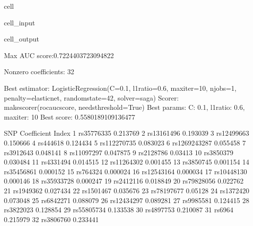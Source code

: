 \documentclass[letterpaper,10pt,english]{jupyterBook}
\begin{document}
\begin{sphinxuseclass}{cell}
\begin{sphinxVerbatimInput}
\begin{sphinxuseclass}{cell_input}
\end{sphinxuseclass}\end{sphinxVerbatimInput}
\begin{sphinxVerbatimOutput}

\begin{sphinxuseclass}{cell_output}
\begin{sphinxVerbatim}[commandchars=\\\{\}]
Max AUC score:0.7224403723094822

Non\PYGZhy{}zero coefficients: 32

Best estimator: LogisticRegression(C=0.1, l1\PYGZus{}ratio=0.6, max\PYGZus{}iter=10, n\PYGZus{}jobs=\PYGZhy{}1,
                   penalty=\PYGZsq{}elasticnet\PYGZsq{}, random\PYGZus{}state=42, solver=\PYGZsq{}saga\PYGZsq{})
Scorer: make\PYGZus{}scorer(roc\PYGZus{}auc\PYGZus{}score, needs\PYGZus{}threshold=True)
Best params: \PYGZob{}\PYGZsq{}C\PYGZsq{}: 0.1, \PYGZsq{}l1\PYGZus{}ratio\PYGZsq{}: 0.6, \PYGZsq{}max\PYGZus{}iter\PYGZsq{}: 10\PYGZcb{}
Best score: 0.5580189109136477
\end{sphinxVerbatim}

\begin{sphinxVerbatim}[commandchars=\\\{\}]
                SNP Coefficient
Index                          
1        rs35776335   \PYGZhy{}0.213769
2        rs13161496   \PYGZhy{}0.193039
3        rs12499663   \PYGZhy{}0.150666
4          rs444618   \PYGZhy{}0.124434
5       rs112270735   \PYGZhy{}0.083023
6      rs1269243287   \PYGZhy{}0.055458
7         rs3912643   \PYGZhy{}0.048141
8        rs11097297   \PYGZhy{}0.047875
9         rs2128786    \PYGZhy{}0.03413
10        rs3850379   \PYGZhy{}0.030484
11        rs4331494   \PYGZhy{}0.014515
12       rs11264302   \PYGZhy{}0.001455
13        rs3850745   \PYGZhy{}0.001154
14       rs35456861   \PYGZhy{}0.000152
15         rs764324   \PYGZhy{}0.000024
16       rs12543164    0.000034
17       rs10448130    0.000146
18       rs35933728    0.000247
19        rs2412116    0.018849
20       rs79828056    0.022762
21        rs1949362    0.027434
22        rs1501467    0.035676
23       rs78197677     0.05128
24        rs1372420    0.073048
25        rs6842271    0.088079
26       rs12434297    0.089281
27        rs9985581    0.124415
28        rs3822023    0.128854
29       rs55805734    0.133538
30        rs4897753    0.210087
31           rs6964    0.215979
32        rs3806760    0.233441
\end{sphinxVerbatim}

\end{sphinxuseclass}\end{sphinxVerbatimOutput}

\end{sphinxuseclass}
\end{document}
